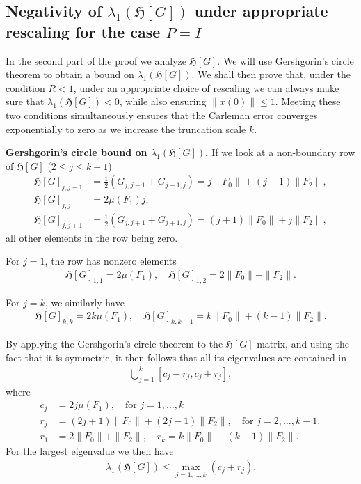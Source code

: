 \documentclass[superscriptaddress,onecolumn,nofootinbib,longbibliography,a4paper,accepted=2026-09-29]{quantumarticle}
\theoremstyle{plain}
\theoremstyle{definition}
\numberwithin{thm}{section}
\numberwithin{assumption}{section}
\numberwithin{lemma}{section}
\numberwithin{prop}{section}
\numberwithin{cor}{section}
\numberwithin{definition}{section}
\numberwithin{rmk}{section}
\numberwithin{equation}{section}
\newcommand{\hh}[1]{\ensuremath{\mathfrak{H}\left[#1\right]}}
\begin{document}

\subsection{Negativity of \texorpdfstring{$\lambda_1(\hh{G})$}{the largest eigenvalue} under appropriate rescaling for the case \texorpdfstring{$P=I$}{P=I}} 

In the second part of the proof we analyze $\hh{G}$. We will use Gershgorin's circle theorem to obtain a bound on $\lambda_1(\hh{G})$. We shall then prove that, under the condition $R<1$, under an appropriate choice of rescaling we can always make sure that $\lambda_1(\hh{G})<0$, while also ensuring \mbox{$\|x(0)\|\leq 1$}. Meeting these two conditions simultaneously ensures that the Carleman error converges exponentially to zero as we increase the truncation scale $k$.

\bigskip

\textbf{Gershgorin's circle bound on $\lambda_1(\hh{G})$.}    If we look at a non-boundary row of $\hh{G}$ ($2 \leq j \leq k-1$)
 \begin{align}
     \hh{G}_{j,j-1} &= \frac{1}{2}(G_{j,j-1}+G_{j-1,j}) = j \| F_0\| + (j-1)\|F_2\|, \\ \hh{G}_{j,j} &= 2\mu(F_1) j, \\ \hh{G}_{j,j+1} & = \frac{1}{2}(G_{j,j+1}+G_{j+1,j}) = (j+1) \| F_0\| + j \|F_2\|,
 \end{align}
all other elements in the row being zero.

For $j=1$, the row has nonzero elements 
\begin{align}
    \hh{G}_{1,1} = 2 \mu(F_1), \quad \hh{G}_{1,2} = 2 \| F_0\| + \| F_2\|.
\end{align} 

For $j=k$, we similarly have 
\begin{align}
    \hh{G}_{k,k} = 2 k \mu(F_1), \quad \hh{G}_{k,k-1} =  k \| F_0\| + (k-1) \| F_2\|.
\end{align} 

By applying the Gershgorin's circle theorem to the $\hh{G}$ matrix, and using the fact that it is symmetric, it then follows that all its eigenvalues are contained in 
\begin{align}
    \bigcup_{j=1}^{k} [c_j - r_j, c_j + r_j],
\end{align}
where
\begin{align}
    c_j &= 2 j \mu(F_1), \quad \textrm{for } j=1,\dots, k \\ 
    r_j & =  (2j+1) \| F_0\| + (2j-1) \| F_2\|, \quad \textrm{for } j=2,\dots, k -1, \\ r_1 & = 2 \|F_0 \| + \|F_2\|, \quad r_{k} = k \|F_0\| + (k-1) \|F_2\|. 
\end{align}
For the largest eigenvalue we then have
\begin{align}
     \lambda_1(\hh{G}) \leq \max_{j=1, \dots, k} (c_j + r_j). 
\end{align}
\end{document}

